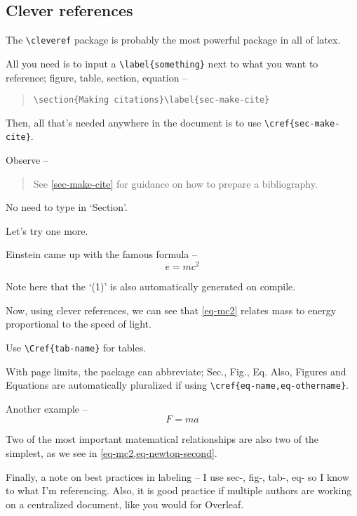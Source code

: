 \documentclass[11pt,a4paper]{article}
\begin{document}
\subsection*{Clever references}
The \verb=\cleveref= package is probably the most powerful package in all of latex. 

All you need is to input a \verb=\label{something}= next to what you want to reference; figure, table, section, equation --
\begin{quote}
\verb=\section{Making citations}\label{sec-make-cite}=
\end{quote}

Then, all that's needed anywhere in the document is to use \verb=\cref{sec-make-cite}=. 

Observe --
\begin{quote}
    See \cref{sec-make-cite} for guidance on how to prepare a bibliography.
\end{quote}

No need to type in `Section'. 

Let's try one more. 

Einstein came up with the famous formula --
\begin{equation}\label{eq-mc2}
    e = mc^2
\end{equation}

Note here that the `(1)' is also automatically generated on compile. 

Now, using clever references, we can see that \cref{eq-mc2} relates mass to energy proportional to the speed of light. 

Use \verb=\Cref{tab-name}= for tables. 

With page limits, the package can abbreviate; Sec., Fig., Eq. Also, Figures and Equations are automatically pluralized if using \verb=\cref{eq-name,eq-othername}=. 

Another example --
\begin{equation}\label{eq-newton-second}
    F = ma
\end{equation}

Two of the most important matematical relationships are also two of the simplest, as we see in \cref{eq-mc2,eq-newton-second}.

Finally, a note on best practices in labeling -- I use sec-, fig-, tab-, eq- so I know to what I'm referencing. Also, it is good practice if multiple authors are working on a centralized document, like you would for Overleaf. 
\end{document}
